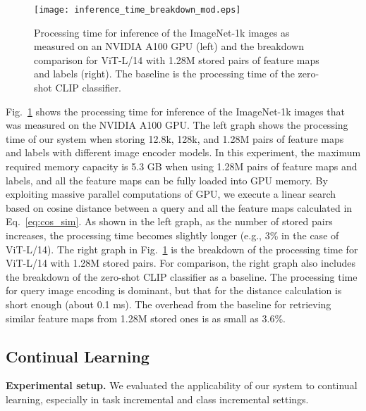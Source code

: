 \documentclass[runningheads]{llncs}
\begin{document}
\begin{figure}[t]
   \begin{center}
   \texttt{[image: inference\_time\_breakdown\_mod.eps]}
   \end{center}
   \caption{Processing time for inference of the ImageNet-1k images as measured on an NVIDIA A100 GPU (left)
   and the breakdown comparison for ViT-L/14 with 1.28M stored pairs of feature maps and labels (right).
   The baseline is the processing time of the zero-shot CLIP classifier.}
   \label{fig:inference_time_breakdown}
\end{figure}


Fig.~\ref{fig:inference_time_breakdown} shows the processing time for inference of the ImageNet-1k images that was measured on the NVIDIA A100 GPU.
The left graph shows the processing time of our system when storing 12.8k, 128k, and 1.28M pairs of feature maps and labels with different image encoder models.
In this experiment, the maximum required memory capacity is 5.3 GB when using 1.28M pairs of feature maps and labels, and all the feature maps can be fully loaded into GPU memory.
By exploiting massive parallel computations of GPU, we execute a linear search based on cosine distance between a query and all the feature maps calculated in Eq.~\eqref{eq:cos_sim}.
As shown in the left graph, as the number of stored pairs increases, the processing time becomes slightly longer (e.g., 3\% in the case of ViT-L/14).
The right graph in Fig.~\ref{fig:inference_time_breakdown} is the breakdown of the processing time for ViT-L/14 with 1.28M stored pairs.
For comparison, the right graph also includes the breakdown of the zero-shot CLIP classifier as a baseline.
The processing time for query image encoding is dominant, but that for the distance calculation is short enough (about 0.1 ms).
The overhead from the baseline for retrieving similar feature maps from 1.28M stored ones is as small as 3.6\%.


\subsection{Continual Learning}
\label{exprmnt:continual_learn}

\noindent
\textbf{Experimental setup.} We evaluated the applicability of our system to continual learning, especially in task incremental and class incremental settings.
\end{document}
